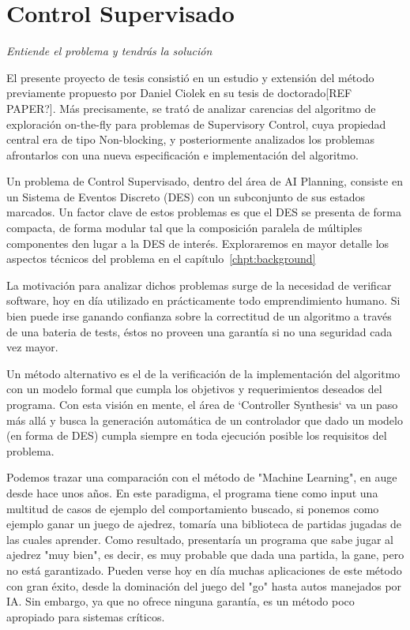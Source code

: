 \section{Control Supervisado}
{\begin{small}%
\begin{flushright}%
\it
Entiende el problema y tendrás la solución
\end{flushright}%
\end{small}%
\vspace{.5cm}}
El presente proyecto de tesis consistió en un estudio y extensión del método previamente propuesto por Daniel Ciolek en su tesis de doctorado[REF PAPER?]. Más precisamente, se trató de analizar carencias del algoritmo de exploración on-the-fly para problemas de Supervisory Control, cuya propiedad central era de tipo Non-blocking, y posteriormente analizados los problemas afrontarlos con una nueva especificación e implementación del algoritmo.

Un problema de Control Supervisado, dentro del área de AI Planning, consiste en un Sistema de Eventos Discreto (DES) con un subconjunto de sus estados marcados. Un factor clave de estos problemas es que el DES se presenta de forma compacta, de forma modular tal que la composición paralela de múltiples componentes den lugar a la DES de interés. Exploraremos en mayor detalle los aspectos técnicos del problema en el capítulo~\ref{chpt:background}

La motivación para analizar dichos problemas surge de la necesidad de verificar software, hoy en día utilizado en prácticamente todo emprendimiento humano. Si bien puede irse ganando confianza sobre la correctitud de un algoritmo a través de una bateria de tests, éstos no proveen una garantía si no una seguridad cada vez mayor. 

Un método alternativo es el de la verificación de la implementación del algoritmo con un modelo formal que cumpla los objetivos y requerimientos deseados del programa. Con esta visión en mente, el área de `Controller Synthesis` va un paso más allá y busca la generación automática de un controlador que dado un modelo (en forma de DES) cumpla siempre en toda ejecución posible los requisitos del problema.

Podemos trazar una comparación con el método de "Machine Learning", en auge desde hace unos años. En este paradigma, el programa tiene como input una multitud de casos de ejemplo del comportamiento buscado, si ponemos como ejemplo ganar un juego de ajedrez, tomaría una biblioteca de partidas jugadas de las cuales aprender. Como resultado, presentaría un programa que sabe jugar al ajedrez "muy bien", es decir, es muy probable que dada una partida, la gane, pero no está garantizado. Pueden verse hoy en día muchas aplicaciones de este método con gran éxito, desde la dominación del juego del "go" hasta autos manejados por IA. Sin embargo, ya que no ofrece ninguna garantía, es un método poco apropiado para sistemas críticos.


